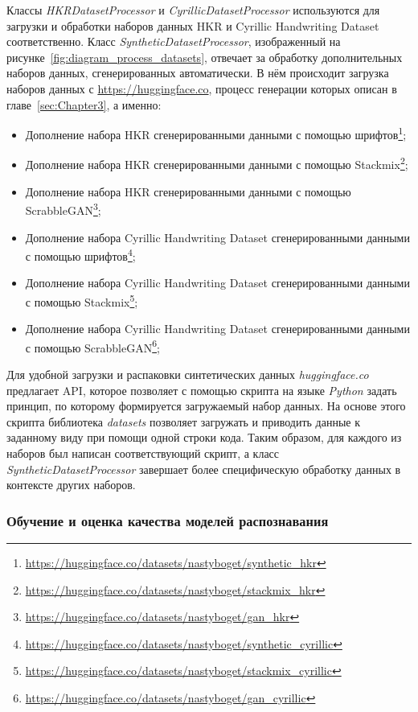 Классы \textit{HKRDatasetProcessor} и \textit{CyrillicDatasetProcessor} используются для загрузки и обработки наборов данных HKR и Cyrillic Handwriting Dataset соответственно.
Класс \textit{SyntheticDatasetProcessor}, изображенный на рисунке~\ref{fig:diagram_process_datasets}, отвечает за обработку дополнительных наборов данных, сгенерированных автоматически.
В нём происходит загрузка наборов данных с \url{https://huggingface.co}, процесс генерации которых описан в главе~\ref{sec:Chapter3}, а именно:
\begin{itemize}
    \item Дополнение набора HKR сгенерированными данными с помощью шрифтов\footnote{\url{https://huggingface.co/datasets/nastyboget/synthetic_hkr}};
    \item Дополнение набора HKR сгенерированными данными с помощью Stackmix\footnote{\url{https://huggingface.co/datasets/nastyboget/stackmix_hkr}};
    \item Дополнение набора HKR сгенерированными данными с помощью ScrabbleGAN\footnote{\url{https://huggingface.co/datasets/nastyboget/gan_hkr}};
    \item Дополнение набора Cyrillic Handwriting Dataset сгенерированными данными с помощью шрифтов\footnote{\url{https://huggingface.co/datasets/nastyboget/synthetic_cyrillic}};
    \item Дополнение набора Cyrillic Handwriting Dataset сгенерированными данными с помощью Stackmix\footnote{\url{https://huggingface.co/datasets/nastyboget/stackmix_cyrillic}};
    \item Дополнение набора Cyrillic Handwriting Dataset сгенерированными данными с помощью ScrabbleGAN\footnote{\url{https://huggingface.co/datasets/nastyboget/gan_cyrillic}};
\end{itemize}

Для удобной загрузки и распаковки синтетических данных \textit{huggingface.co} предлагает API, которое позволяет с помощью
скрипта на языке \textit{Python} задать принцип, по которому формируется загружаемый набор данных.
На основе этого скрипта библиотека \textit{datasets} позволяет загружать и приводить данные к заданному виду при помощи одной строки кода.
Таким образом, для каждого из наборов был написан соответствующий скрипт, а класс \textit{SyntheticDatasetProcessor}
завершает более специфическую обработку данных в контексте других наборов.


\subsubsection{Обучение и оценка качества моделей распознавания}
\label{subsubsec:models-train-evaluation}

